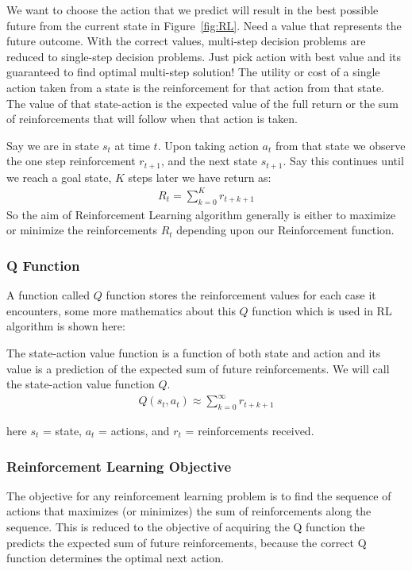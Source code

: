 \documentclass{report}
\begin{document}
We want to choose the action that we predict will result in the best possible future from the current state in Figure~\ref{fig:RL}. Need a value that represents the future outcome. With the correct values, multi-step decision problems are reduced to single-step decision problems. Just pick action with best value and its guaranteed to find optimal multi-step solution! The utility or cost of a single action taken from a state is the reinforcement for that action from that state. The value of that state-action is the expected value of the full return or the sum of reinforcements that will follow when that action is taken.\par
Say we are in state $s_t$ at time $t$. Upon taking action $a_t$ from that state we observe the one step reinforcement $r_{t+1}$, and the next state $s_{t+1}$. Say this continues until we reach a goal state, $K$ steps later we have return as:
 \begin{align*}
      R_t = \sum_{k=0}^K r_{t+k+1}
  \end{align*}
So the aim of Reinforcement Learning algorithm generally is either to maximize or minimize the reinforcements $R_t$ depending upon our Reinforcement function.

\subsubsection{Q Function}
A function called $Q$ function stores the reinforcement values for each case it encounters, some more mathematics about this $Q$ function which is used in RL algorithm is shown here:

The state-action value function is a function of both state and action and its value is a prediction of the expected sum of future reinforcements. We will call the state-action value function $Q$.
\begin{align*}
      Q(s_t,a_t) \approx \sum_{k=0}^\infty r_{t+k+1}
\end{align*}

here $s_t$ = state, $a_t$ = actions, and $r_t$ = reinforcements received.


\subsubsection{Reinforcement Learning Objective}
The objective for any reinforcement learning problem is to find the sequence of actions that maximizes (or minimizes) the sum of reinforcements along the sequence. This is reduced to the objective of acquiring the Q function the predicts the expected sum of future reinforcements, because the correct Q function determines the optimal next action.
\end{document}
